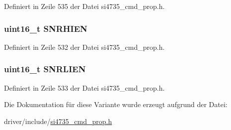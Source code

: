 Definiert in Zeile 535 der Datei si4735\+\_\+cmd\+\_\+prop.\+h.

\hypertarget{unionfm__rsq__int__source_a024d64d4dd48191f3ac5fff26a4e780c}{}
\subsubsection[{S\+N\+R\+H\+I\+E\+N}]{\setlength{\rightskip}{0pt plus 5cm}uint16\+\_\+t S\+N\+R\+H\+I\+E\+N}\label{unionfm__rsq__int__source_a024d64d4dd48191f3ac5fff26a4e780c}


Definiert in Zeile 532 der Datei si4735\+\_\+cmd\+\_\+prop.\+h.

\hypertarget{unionfm__rsq__int__source_a1e8d526e51a38776582287db0a28c55c}{}
\subsubsection[{S\+N\+R\+L\+I\+E\+N}]{\setlength{\rightskip}{0pt plus 5cm}uint16\+\_\+t S\+N\+R\+L\+I\+E\+N}\label{unionfm__rsq__int__source_a1e8d526e51a38776582287db0a28c55c}


Definiert in Zeile 533 der Datei si4735\+\_\+cmd\+\_\+prop.\+h.



Die Dokumentation für diese Variante wurde erzeugt aufgrund der Datei\+:\begin{DoxyCompactItemize}
\item 
driver/include/\hyperlink{si4735__cmd__prop_8h}{si4735\+\_\+cmd\+\_\+prop.\+h}\end{DoxyCompactItemize}
